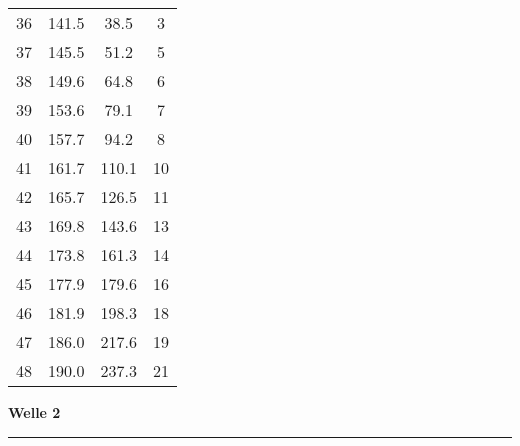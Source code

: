 \documentclass[10pt, a4paper]{article}
\begin{document}
\begin{center}
\begin{tabular}{c|c|c|c}
		36 & 141.5 & 38.5 & 3 \\
		37 & 145.5 & 51.2 & 5 \\
		38 & 149.6 & 64.8 & 6 \\
		39 & 153.6 & 79.1 & 7 \\
		40 & 157.7 & 94.2 & 8 \\
		41 & 161.7 & 110.1 & 10 \\
		42 & 165.7 & 126.5 & 11 \\
		43 & 169.8 & 143.6 & 13 \\
		44 & 173.8 & 161.3 & 14 \\
		45 & 177.9 & 179.6 & 16 \\
		46 & 181.9 & 198.3 & 18 \\
		47 & 186.0 & 217.6 & 19 \\
		48 & 190.0 & 237.3 & 21 \\
	\end{tabular}
\end{center}
\newpage
\centerline{{\bf Welle 2} }
\rule{1.0\textwidth}{0.5mm}
\end{document}
